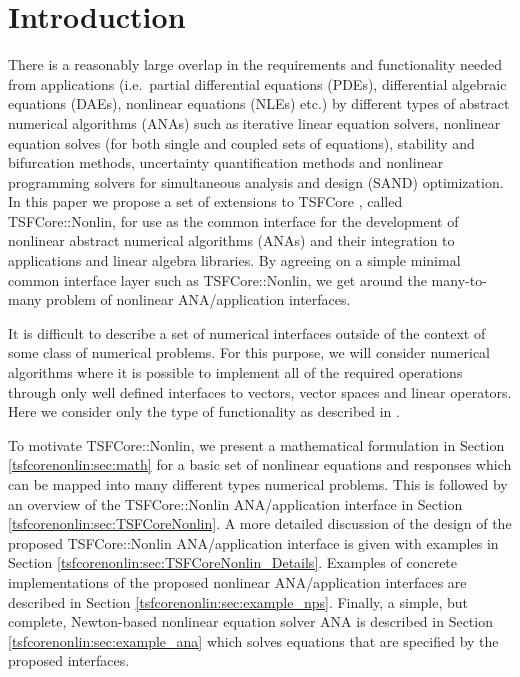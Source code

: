 \section{Introduction}

There is a reasonably large overlap in the requirements and
functionality needed from applications (i.e.~partial differential
equations (PDEs), differential algebraic equations (DAEs), nonlinear
equations (NLEs) etc.) by different types of abstract numerical
algorithms (ANAs) such as iterative linear equation solvers, nonlinear
equation solves (for both single and coupled sets of equations),
stability and bifurcation methods, uncertainty quantification methods
and nonlinear programming solvers for simultaneous analysis and design
(SAND) optimization.  In this paper we propose a set of extensions to
TSFCore \cite{ref:TSFCore}, called TSFCore::Nonlin, for use as the
common interface for the development of nonlinear abstract numerical
algorithms (ANAs) and their integration to applications and linear
algebra libraries.  By agreeing on a simple minimal common interface
layer such as TSFCore::Nonlin, we get around the many-to-many problem
of nonlinear ANA/application interfaces.

It is difficult to describe a set of numerical interfaces outside of
the context of some class of numerical problems.  For this purpose, we
will consider numerical algorithms where it is possible to implement
all of the required operations through only well defined interfaces to
vectors, vector spaces and linear operators.  Here we consider only
the type of functionality as described in
\cite{ref:opt_ctrl_itfc}.

To motivate TSFCore::Nonlin, we present a mathematical formulation in
Section \ref{tsfcorenonlin:sec:math} for a basic set of nonlinear
equations and responses which can be mapped into many different types
numerical problems.  This is followed by an overview of the
TSFCore::Nonlin ANA/application interface in Section
\ref{tsfcorenonlin:sec:TSFCoreNonlin}.
A more detailed discussion of the design of the proposed
TSFCore::Nonlin ANA/application interface is given with examples in
Section \ref{tsfcorenonlin:sec:TSFCoreNonlin_Details}.  Examples of
concrete implementations of the proposed nonlinear ANA/application
interfaces are described in Section
\ref{tsfcorenonlin:sec:example_nps}.  Finally, a simple, but complete,
Newton-based nonlinear equation solver ANA is described in Section
\ref{tsfcorenonlin:sec:example_ana} which solves equations that are
specified by the proposed interfaces.

